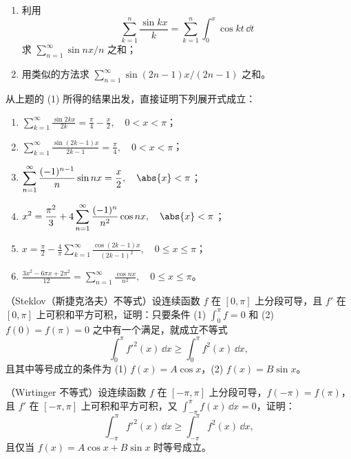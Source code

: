 \begin{xreferenceproblem}[5]
\begin{enumerate}[label=(\arabic*)]
    \item 利用
    \[
      \sum_{k=1}^{n}\frac{\sin kx}{k}=\sum_{k=1}^{n}\int_0^x\cos kt\,\dd t
    \]
    求 $\sum_{n=1}^{\infty}\sin nx/n$ 之和；
    \item 用类似的方法求 $\sum_{n=1}^{\infty}\sin(2n-1)x/(2n-1)$ 之和。
  \end{enumerate}
\end{xreferenceproblem}

\begin{xreferenceproblem}[6]
从上题的 (1) 所得的结果出发，直接证明下列展开式成立：
  \begin{enumerate}[label=(\arabic*)]
    \item $\displaystyle \sum_{k=1}^{\infty}\frac{\sin2kx}{2k}=\frac\pi4-\frac x2,\quad0<x<\pi$；
    \item $\displaystyle \sum_{k=1}^{\infty}\frac{\sin(2k-1)x}{2k-1}=\frac\pi4,\quad0<x<\pi$；
    \item $\displaystyle \sum_{n=1}^{\infty}\frac{(-1)^{n-1}}n\sin nx=\frac x2,\quad\abs{x}<\pi$；
    \item $\displaystyle x^2=\frac{\pi^2}{3}+4\sum_{n=1}^{\infty}\frac{(-1)^n}{n^2}\cos nx,\quad\abs{x}<\pi$；
    \item $\displaystyle x=\frac\pi2-\frac4\pi\sum_{k=1}^{\infty}\frac{\cos(2k-1)x}{(2k-1)^2},\quad0\le x\le\pi$；
    \item $\displaystyle \frac{3x^2-6\pi x+2\pi^2}{12}=\sum_{n=1}^{\infty}\frac{\cos nx}{n^2},\quad0\le x\le\pi$。
  \end{enumerate}
\end{xreferenceproblem}

\begin{xreferenceproblem}[7]
（Steklov（斯捷克洛夫）不等式）设连续函数 $f$ 在 $[0,\pi]$ 上分段可导，且 $f'$ 在 $[0,\pi]$ 上可积和平方可积，证明：只要条件 (1) $\int_0^{\pi}f=0$ 和 (2) $f(0)=f(\pi)=0$ 之中有一个满足，就成立不等式
  \[
    \int_0^{\pi}f'^2(x)\,\dd x\ge\int_0^{\pi}f^2(x)\,\dd x,
  \]
  且其中等号成立的条件为 (1) $f(x)=A\cos x$，(2) $f(x)=B\sin x$。
\end{xreferenceproblem}

\begin{xreferenceproblem}[8]
（Wirtinger 不等式）设连续函数 $f$ 在 $[-\pi,\pi]$ 上分段可导，$f(-\pi)=f(\pi)$，且 $f'$ 在 $[-\pi,\pi]$ 上可积和平方可积，又 $\int_{-\pi}^{\pi}f(x)\,\dd x=0$，证明：
  \[
    \int_{-\pi}^{\pi}f'^2(x)\,\dd x\ge\int_{-\pi}^{\pi}f^2(x)\,\dd x,
  \]
  且仅当 $f(x)=A\cos x+B\sin x$ 时等号成立。
\end{xreferenceproblem}

